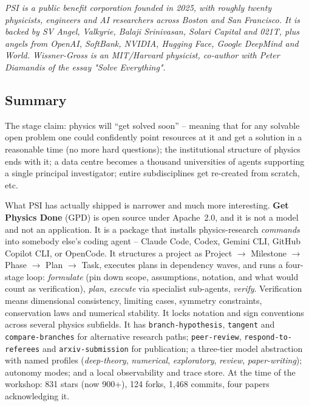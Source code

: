 \documentclass[11pt]{article}
\begin{document}
\emph{PSI is a public benefit corporation founded in 2025, with roughly twenty physicists, engineers and AI researchers across Boston and San Francisco. It is backed by SV Angel, Valkyrie, Balaji Srinivasan, Solari Capital and 021T, plus angels from OpenAI, SoftBank, NVIDIA, Hugging Face, Google DeepMind and World. Wissner-Gross is an MIT/Harvard physicist, co-author with Peter Diamandis of the essay "Solve Everything"}.

\subsection*{Summary}
The stage claim: physics will ``get solved soon'' -- meaning that for any solvable open problem one could confidently point resources at it and get a solution in a reasonable time (no more hard questions); the institutional structure of physics ends with it; a data centre becomes a thousand universities of agents supporting a single principal investigator; entire subdisciplines get re-created from scratch, etc. 

What PSI has actually shipped is narrower and much more interesting. \textbf{Get Physics Done} (GPD) is open source under Apache~2.0, and it is not a model and not an application. It is a package that installs physics-research \emph{commands} into somebody else's coding agent -- Claude Code, Codex, Gemini CLI, GitHub Copilot CLI, or OpenCode. It structures a project as Project $\to$ Milestone $\to$ Phase $\to$ Plan $\to$ Task, executes plans in dependency waves, and runs a four-stage loop: \emph{formulate} (pin down scope, assumptions, notation, and what would count as verification), \emph{plan}, \emph{execute} via specialist sub-agents, \emph{verify}. Verification means dimensional consistency, limiting cases, symmetry constraints, conservation laws and numerical stability. It locks notation and sign conventions across several physics subfields. It has \texttt{branch-hypothesis}, \texttt{tangent} and \texttt{compare-branches} for alternative research paths; \texttt{peer-review}, \texttt{respond-to-referees} and \texttt{arxiv-submission} for publication; a three-tier model abstraction with named profiles (\emph{deep-theory}, \emph{numerical}, \emph{exploratory}, \emph{review}, \emph{paper-writing}); autonomy modes; and a local observability and trace store. At the time of the workshop: 831 stars (now 900+), 124 forks, 1{,}468 commits, four papers acknowledging it.
\end{document}
